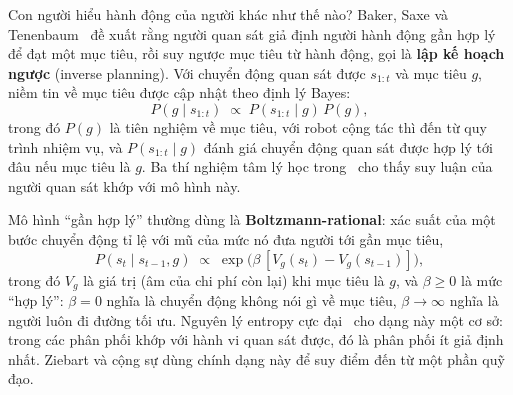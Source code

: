 Con người hiểu hành động của người khác như thế nào? Baker, Saxe và Tenenbaum~\cite{baker2009inverse} đề xuất rằng người quan sát giả định người hành động gần hợp lý để đạt một mục tiêu, rồi suy ngược mục tiêu từ hành động, gọi là \textbf{lập kế hoạch ngược} (inverse planning). Với chuyển động quan sát được $s_{1:t}$ và mục tiêu $g$, niềm tin về mục tiêu được cập nhật theo định lý Bayes:
\begin{equation}
  P(g\mid s_{1:t})\;\propto\;P(s_{1:t}\mid g)\,P(g),
  \label{eq:inverse-planning}
\end{equation}
trong đó $P(g)$ là tiên nghiệm về mục tiêu, với robot cộng tác thì đến từ quy trình nhiệm vụ, và $P(s_{1:t}\mid g)$ đánh giá chuyển động quan sát được hợp lý tới đâu nếu mục tiêu là $g$. Ba thí nghiệm tâm lý học trong~\cite{baker2009inverse} cho thấy suy luận của người quan sát khớp với mô hình này.

Mô hình ``gần hợp lý'' thường dùng là \textbf{Boltzmann-rational}: xác suất của một bước chuyển động tỉ lệ với mũ của mức nó đưa người tới gần mục tiêu,
\begin{equation}
  P(s_{t}\mid s_{t-1},g)\;\propto\;\exp\!\big(\beta\,[V_g(s_t)-V_g(s_{t-1})]\big),
  \label{eq:boltzmann}
\end{equation}
trong đó $V_g$ là giá trị (âm của chi phí còn lại) khi mục tiêu là $g$, và $\beta\ge0$ là mức ``hợp lý'': $\beta=0$ nghĩa là chuyển động không nói gì về mục tiêu, $\beta\to\infty$ nghĩa là người luôn đi đường tối ưu. Nguyên lý entropy cực đại~\cite{ziebart2008maxent} cho dạng này một cơ sở: trong các phân phối khớp với hành vi quan sát được, đó là phân phối ít giả định nhất. Ziebart và cộng sự dùng chính dạng này để suy điểm đến từ một phần quỹ đạo.

